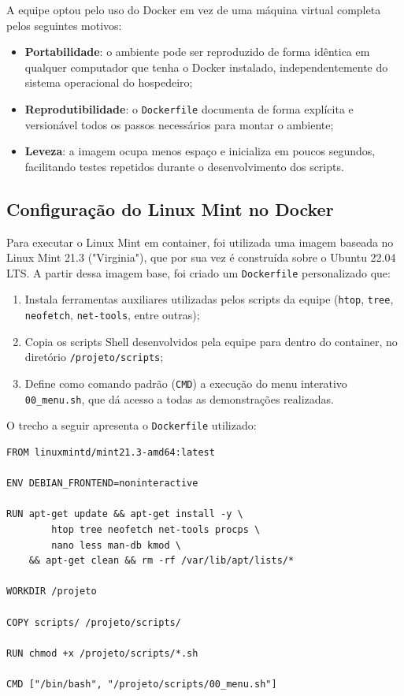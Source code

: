 \documentclass[a4paper,12pt]{article}
\begin{document}
A equipe optou pelo uso do Docker em vez de uma máquina virtual completa pelos
seguintes motivos:

\begin{itemize}
    \item \textbf{Portabilidade}: o ambiente pode ser reproduzido de forma
          idêntica em qualquer computador que tenha o Docker instalado,
          independentemente do sistema operacional do hospedeiro;
    \item \textbf{Reprodutibilidade}: o \texttt{Dockerfile} documenta de
          forma explícita e versionável todos os passos necessários para
          montar o ambiente;
    \item \textbf{Leveza}: a imagem ocupa menos espaço e inicializa em
          poucos segundos, facilitando testes repetidos durante o
          desenvolvimento dos scripts.
\end{itemize}

\subsection{Configuração do Linux Mint no Docker}

Para executar o Linux Mint em container, foi utilizada uma imagem baseada no
Linux Mint 21.3 ("Virginia"), que por sua vez é construída sobre o Ubuntu 22.04
LTS. A partir dessa imagem base, foi criado um \texttt{Dockerfile}
personalizado que:

\begin{enumerate}
    \item Instala ferramentas auxiliares utilizadas pelos scripts da equipe
          (\texttt{htop}, \texttt{tree}, \texttt{neofetch},
          \texttt{net-tools}, entre outras);
    \item Copia os scripts Shell desenvolvidos pela equipe para dentro do
          container, no diretório \texttt{/projeto/scripts};
    \item Define como comando padrão (\texttt{CMD}) a execução do menu
          interativo \texttt{00\_menu.sh}, que dá acesso a todas as
          demonstrações realizadas.
\end{enumerate}

O trecho a seguir apresenta o \texttt{Dockerfile} utilizado:

\begin{lstlisting}[caption={Dockerfile do ambiente Linux Mint}]
FROM linuxmintd/mint21.3-amd64:latest

ENV DEBIAN_FRONTEND=noninteractive

RUN apt-get update && apt-get install -y \
        htop tree neofetch net-tools procps \
        nano less man-db kmod \
    && apt-get clean && rm -rf /var/lib/apt/lists/*

WORKDIR /projeto

COPY scripts/ /projeto/scripts/

RUN chmod +x /projeto/scripts/*.sh

CMD ["/bin/bash", "/projeto/scripts/00_menu.sh"]
\end{lstlisting}
\end{document}
